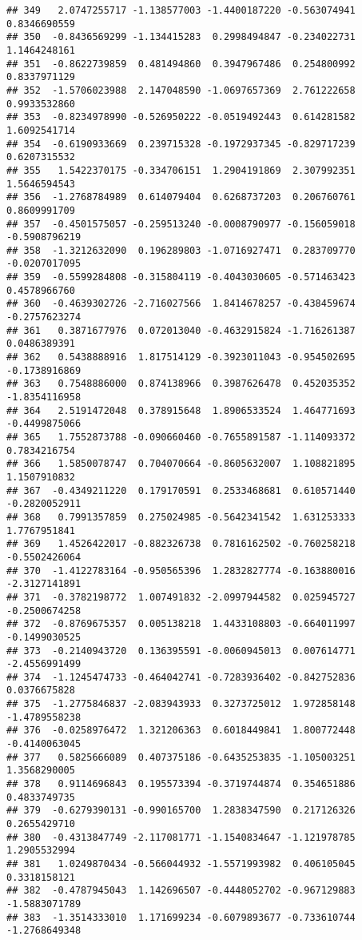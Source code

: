 \documentclass[
]{article}
\begin{document}
\begin{verbatim}
## 349   2.0747255717 -1.138577003 -1.4400187220 -0.563074941  0.8346690559
## 350  -0.8436569299 -1.134415283  0.2998494847 -0.234022731  1.1464248161
## 351  -0.8622739859  0.481494860  0.3947967486  0.254800992  0.8337971129
## 352  -1.5706023988  2.147048590 -1.0697657369  2.761222658  0.9933532860
## 353  -0.8234978990 -0.526950222 -0.0519492443  0.614281582  1.6092541714
## 354  -0.6190933669  0.239715328 -0.1972937345 -0.829717239  0.6207315532
## 355   1.5422370175 -0.334706151  1.2904191869  2.307992351  1.5646594543
## 356  -1.2768784989  0.614079404  0.6268737203  0.206760761  0.8609991709
## 357  -0.4501575057 -0.259513240 -0.0008790977 -0.156059018 -0.5908796219
## 358  -1.3212632090  0.196289803 -1.0716927471  0.283709770 -0.0207017095
## 359  -0.5599284808 -0.315804119 -0.4043030605 -0.571463423  0.4578966760
## 360  -0.4639302726 -2.716027566  1.8414678257 -0.438459674 -0.2757623274
## 361   0.3871677976  0.072013040 -0.4632915824 -1.716261387  0.0486389391
## 362   0.5438888916  1.817514129 -0.3923011043 -0.954502695 -0.1738916869
## 363   0.7548886000  0.874138966  0.3987626478  0.452035352 -1.8354116958
## 364   2.5191472048  0.378915648  1.8906533524  1.464771693 -0.4499875066
## 365   1.7552873788 -0.090660460 -0.7655891587 -1.114093372  0.7834216754
## 366   1.5850078747  0.704070664 -0.8605632007  1.108821895  1.1507910832
## 367  -0.4349211220  0.179170591  0.2533468681  0.610571440 -0.2820052911
## 368   0.7991357859  0.275024985 -0.5642341542  1.631253333  1.7767951841
## 369   1.4526422017 -0.882326738  0.7816162502 -0.760258218 -0.5502426064
## 370  -1.4122783164 -0.950565396  1.2832827774 -0.163880016 -2.3127141891
## 371  -0.3782198772  1.007491832 -2.0997944582  0.025945727 -0.2500674258
## 372  -0.8769675357  0.005138218  1.4433108803 -0.664011997 -0.1499030525
## 373  -0.2140943720  0.136395591 -0.0060945013  0.007614771 -2.4556991499
## 374  -1.1245474733 -0.464042741 -0.7283936402 -0.842752836  0.0376675828
## 375  -1.2775846837 -2.083943933  0.3273725012  1.972858148 -1.4789558238
## 376  -0.0258976472  1.321206363  0.6018449841  1.800772448 -0.4140063045
## 377   0.5825666089  0.407375186 -0.6435253835 -1.105003251  1.3568290005
## 378   0.9114696843  0.195573394 -0.3719744874  0.354651886  0.4833749735
## 379  -0.6279390131 -0.990165700  1.2838347590  0.217126326  0.2655429710
## 380  -0.4313847749 -2.117081771 -1.1540834647 -1.121978785  1.2905532994
## 381   1.0249870434 -0.566044932 -1.5571993982  0.406105045  0.3318158121
## 382  -0.4787945043  1.142696507 -0.4448052702 -0.967129883 -1.5883071789
## 383  -1.3514333010  1.171699234 -0.6079893677 -0.733610744 -1.2768649348

\end{verbatim}
\end{document}
